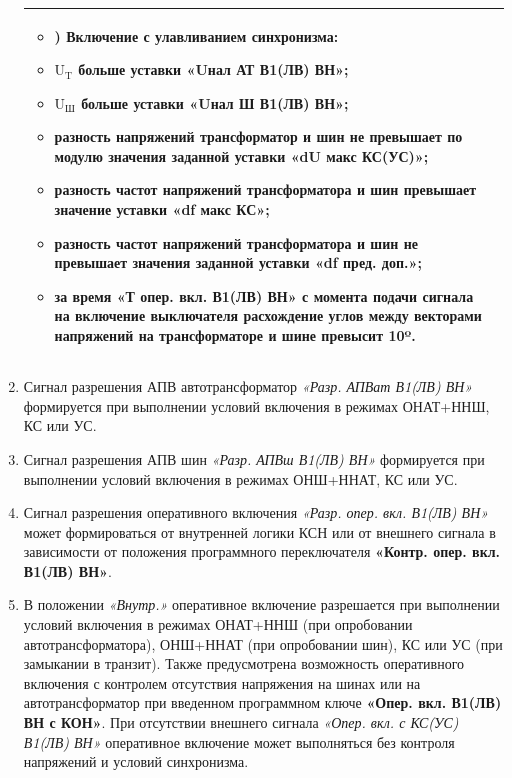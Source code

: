 \documentclass[a4paper, 12pt, table, hidelinks, DIV=calc]{extarticle}
\begin{document}
\begin{enumerate}[label=\arabic{section}.\arabic{subsection}.\arabic{subsubsection}.\arabic*,  align=left, labelsep=4pt, leftmargin=0pt, itemindent=57pt]
\begin{longtable}{|>{\centering\arraybackslash}m{5.3cm}|>{\centering\arraybackslash}m{11.6cm}|}
			\begin{itemize}
			\item[] \noindent  2) Включение с улавливанием синхронизма:
			\item $ \textrm{U}_\textrm{T} $ больше уставки \textbf{«Uнал АТ В1(ЛВ) ВН»};
			\item $ \textrm{U}_\textrm{Ш} $ больше уставки \textbf{«Uнал Ш В1(ЛВ) ВН»};
			\item разность напряжений трансформатор и шин не превышает по модулю значения заданной уставки \textbf{«dU макс КС(УС)»};
			\item разность частот напряжений трансформатора и шин превышает значение уставки \textbf{«df макс КС»};
			\item разность частот напряжений трансформатора и шин не превышает значения заданной уставки \textbf{«df пред. доп.»};
			\item за время \textbf{«Т опер. вкл. В1(ЛВ) ВН»} с момента подачи сигнала на включение выключателя расхождение углов между векторами напряжений на трансформаторе и шине превысит 10º.
			\vspace{3pt}
			\end{itemize} \\
\hline

\end{longtable}
\normalsize	

\item
Сигнал разрешения АПВ автотрансформатор \textit{«Разр. АПВат В1(ЛВ) ВН»} формируется при выполнении условий включения в режимах ОНАТ+ННШ, КС или УС.

\item
Сигнал разрешения АПВ шин \textit{«Разр. АПВш В1(ЛВ) ВН»} формируется при выполнении условий включения в режимах ОНШ+ННАТ, КС или УС. 

\item
Сигнал разрешения оперативного включения \textit{«Разр. опер. вкл. В1(ЛВ) ВН»} может формироваться от внутренней логики КСН или от внешнего сигнала в зависимости от положения программного переключателя \textbf{«Контр. опер. вкл. В1(ЛВ) ВН»}.

\item
В положении \textit{«Внутр.»} оперативное включение разрешается при выполнении условий включения в режимах ОНАТ+ННШ (при опробовании автотрансформатора), ОНШ+ННАТ (при опробовании шин), КС или УС (при замыкании в транзит). Также предусмотрена возможность оперативного включения с контролем отсутствия напряжения на шинах или на автотрансформатор при введенном программном ключе \textbf{«Опер. вкл. В1(ЛВ) ВН с КОН»}. При отсутствии внешнего сигнала \textit{«Опер. вкл. с КС(УС) В1(ЛВ) ВН»} оперативное включение может выполняться без контроля напряжений и условий синхронизма.


\end{enumerate}
\end{document}
